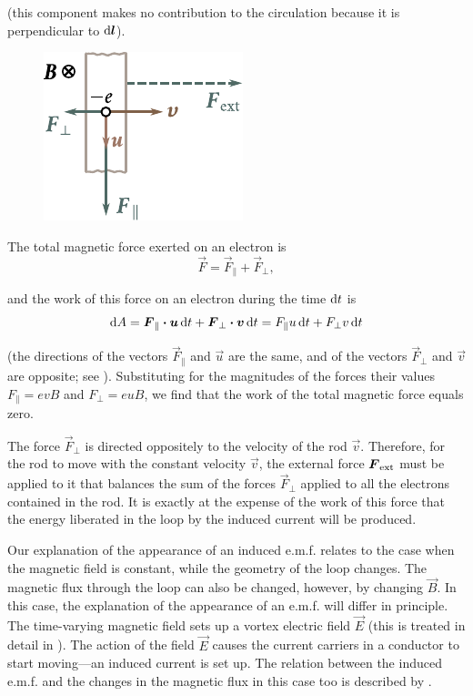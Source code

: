\noindent
(this component makes no contribution to the circulation because it is perpendicular to $\mathrm{d}\boldsymbol{l}$).

\begin{figure}[t]
	\begin{center}
		\includegraphics[scale=1]{figures/ch_08/fig_8_3.pdf}
		\caption[]{}
		\label{fig:8_3}
	\end{center}
	\vspace{-0.8cm}
\end{figure}

The total magnetic force exerted on an electron is
\begin{equation*}
    \vec{F} = \vec{F}_{\parallel} + \vec{F}_{\perp},
\end{equation*}

\noindent
and the work of this force on an electron during the time $\mathrm{d} t$ is
\begin{equation*}
    \mathrm{d} A = \boldsymbol{F}_{\parallel} \boldsymbol{\cdot} \boldsymbol{u}\, \mathrm{d} t + \boldsymbol{F}_{\perp} \boldsymbol{\cdot} \boldsymbol{v}\, \mathrm{d} t = F_{\parallel} u\, \mathrm{d} t + F_{\perp} v\, \mathrm{d} t
\end{equation*}

\noindent
(the directions of the vectors $\vec{F}_{\parallel}$ and $\vec{u}$ are the same, and of the vectors $\vec{F}_{\perp}$ and $\vec{v}$ are opposite; see ).
Substituting for the magnitudes of the forces their values $F_{\parallel}=evB$ and $F_{\perp}=euB$, we find that the work of the total magnetic force equals zero.

The force $\vec{F}_{\perp}$ is directed oppositely to the velocity of the rod $\vec{v}$.
Therefore, for the rod to move with the constant velocity $\vec{v}$, the external force $\boldsymbol{F}_{\text{ext}}$ must be applied to it that balances the sum of the forces $\vec{F}_{\perp}$ applied to all the electrons contained in the rod.
It is exactly at the expense of the work of this force that the energy liberated in the loop by the induced current will be produced.

Our explanation of the appearance of an induced e.m.f. relates to the case when the magnetic field is constant, while the geometry of the loop changes.
The magnetic flux through the loop can also be changed, however, by changing $\vec{B}$.
In this case, the explanation of the appearance of an e.m.f. will differ in principle.
The time-varying magnetic field sets up a vortex electric field $\vec{E}$ (this is treated in detail in ).
The action of the field $\vec{E}$ causes the current carriers in a conductor to start moving---an induced current is set up.
The relation between the induced e.m.f. and the changes in the magnetic flux in this case too is described by .

